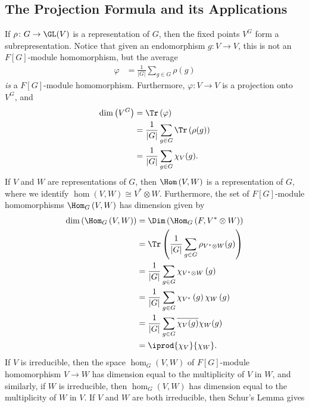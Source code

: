 \documentclass[10pt]{mypackage}
\begin{document}
\subsection{The Projection Formula and its Applications}%
If $\rho\colon G\rightarrow \GL(V)$ is a representation of $G$, then the fixed points $V^{G}$ form a subrepresentation. Notice that given an endomorphism $g\colon V\rightarrow V$, this is not an $F[G]$-module homomorphism, but the average
\begin{align*}
  \varphi &= \frac{1}{\left\vert G \right\vert} \sum_{g\in G} \rho(g)
\end{align*}
\textit{is} a $F[G]$-module homomorphism. Furthermore, $\varphi\colon V\rightarrow V$ is a projection onto $V^{G}$, and
\begin{align*}
  \dim\left( V^{G} \right) &= \Tr\left( \varphi \right)\\
                           &= \frac{1}{\left\vert G \right\vert}\sum_{g\in G} \Tr\left( \rho(g) \right)\\
                           &= \frac{1}{\left\vert G \right\vert}\sum_{g\in G} \chi_{V}(g).
\end{align*}
If $V$ and $W$ are representations of $G$, then $\Hom\left( V,W \right)$ is a representation of $G$, where we identify $\hom\left( V,W \right)\cong V^{\ast}\otimes W$. Furthermore, the set of $F[G]$-module homomorphisms $\Hom_G\left( V,W \right)$ has dimension given by
\begin{align*}
  \dim\left( \Hom_G\left( V,W \right) \right) &= \Dim\left( \Hom_G\left( F,V^{\ast}\otimes W \right) \right)\\
                                              &= \Tr\left( \frac{1}{\left\vert G \right\vert}\sum_{g\in G} \rho_{V^{\ast}\otimes W}(g) \right)\\
                                              &= \frac{1}{\left\vert G \right\vert}\sum_{g\in G} \chi_{V^{\ast}\otimes W}\left( g \right)\\
                                              &= \frac{1}{\left\vert G \right\vert}\sum_{g\in G} \chi_{V^{\ast}}\left( g \right)\chi_{W}\left( g \right)\\
                                                                            &= \frac{1}{\left\vert G \right\vert}\sum_{g\in G} \overline{\chi_V(g)} \chi_W(g)\\
                                                                            &= \iprod{\chi_V}{\chi_W}.
\end{align*}
If $V$ is irreducible, then the space $\hom_{G}\left( V,W \right)$ of $F[G]$-module homomorphism $V\rightarrow W$ has dimension equal to the multiplicity of $V$ in $W$, and similarly, if $W$ is irreducible, then $\hom_G\left( V,W \right)$ has dimension equal to the multiplicity of $W$ in $V$. If $V$ and $W$ are both irreducible, then Schur's Lemma gives
\end{document}
